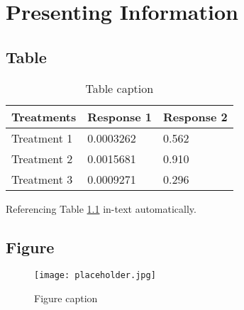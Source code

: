 \documentclass[11pt,fleqn]{book} %
\begin{document}


\chapter{Presenting Information}

\section{Table}

\begin{table}[h]
    \centering
    \begin{tabular}{l l l}
        \toprule
        \textbf{Treatments} & \textbf{Response 1} & \textbf{Response 2} \\
        \midrule
        Treatment 1         & 0.0003262           & 0.562               \\
        Treatment 2         & 0.0015681           & 0.910               \\
        Treatment 3         & 0.0009271           & 0.296               \\
        \bottomrule
    \end{tabular}
    \caption{Table caption}
    \label{tab:example} %
\end{table}

Referencing Table \ref{tab:example} in-text automatically.


\section{Figure}

\begin{figure}[h]
    \centering\texttt{[image: placeholder.jpg]}
    \caption{Figure caption}
    \label{fig:placeholder} %
\end{figure}
\end{document}
